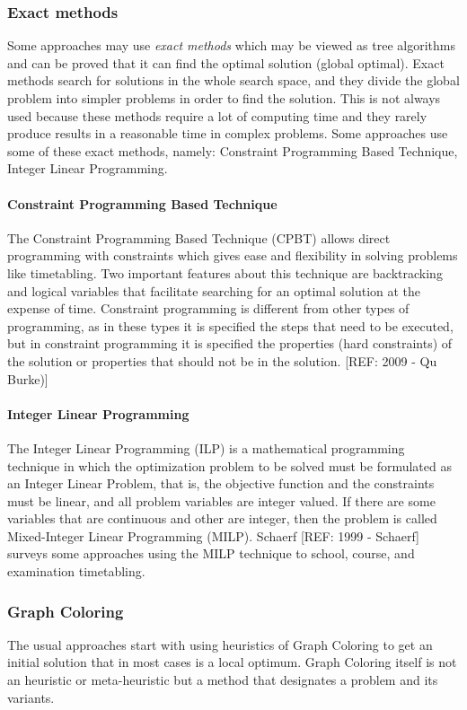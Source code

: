 \subsubsection{Exact methods}
Some approaches may use \textit{exact methods} which may be viewed as tree algorithms and can be proved that it can find the optimal solution (global optimal). Exact methods search for solutions in the whole search space, and they divide the global problem into simpler problems in order to find the solution. This is not always used because these methods require a lot of computing time and they rarely produce results in a reasonable time in complex problems. Some approaches use some of these exact methods, namely: Constraint Programming Based Technique, Integer Linear Programming.\\

\paragraph{Constraint Programming Based Technique}
The Constraint Programming Based Technique (CPBT) allows direct programming with constraints which gives ease and flexibility in solving problems like timetabling. Two important features about this technique are backtracking and logical variables that facilitate searching for an optimal solution at the expense of time. Constraint programming is different from other types of programming, as in these types it is specified the steps that need to be executed, but in constraint programming it is specified the properties (hard constraints) of the solution or properties that should not be in the solution. [REF: 2009 - Qu Burke)]\\

\paragraph{Integer Linear Programming}
The Integer Linear Programming (ILP) is a mathematical programming technique in which the optimization problem to be solved must be formulated as an Integer Linear Problem, that is, the objective function and the constraints must be linear, and all problem variables are integer valued. If there are some variables that are continuous and other are integer, then the problem is called Mixed-Integer Linear Programming (MILP). Schaerf [REF: 1999 - Schaerf] surveys some approaches using the MILP technique to school, course, and examination timetabling.

\subsubsection{Graph Coloring}
The usual approaches start with using heuristics of Graph Coloring to get an initial solution that in most cases is a local optimum. Graph Coloring itself is not an heuristic or meta-heuristic but a method that designates a problem and its variants.\\

